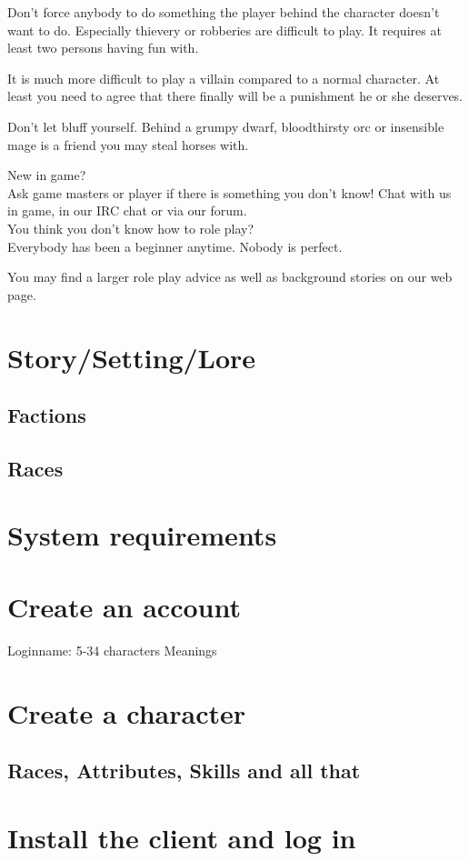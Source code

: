 \documentclass[a4paper,11pt]{scrreprt}
\begin{document}
Don’t force anybody to do something the player behind the character doesn’t want to do. Especially thievery or robberies are difficult to play. It requires at least two persons having 
fun with. 

It is much more difficult to play a villain compared to a normal character. At least you need to 
agree that there finally will be a punishment he or she deserves. 

Don’t let bluff yourself. Behind a grumpy dwarf, bloodthirsty orc or insensible mage is a friend 
you may steal horses with. 

New in game? \\
Ask game masters or player if there is something you don’t know!
Chat with us in game, in our IRC chat or via our forum. 
\\

You think you don’t know how to role play? \\
Everybody has been a beginner anytime. 
Nobody is perfect. 

You may find a larger role play advice as well as background stories on our web page. 

\section{Story/Setting/Lore}
\subsection{Factions}
\subsection{Races}
\section{System requirements}
\section{Create an account}
Loginname: 5-34 characters
Meanings
\section{Create a character}
\subsection{Races, Attributes, Skills and all that}
\section{Install the client and log in}
\end{document}
